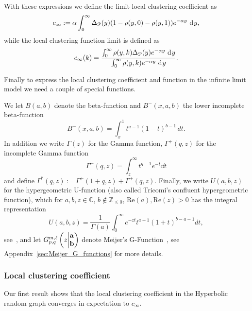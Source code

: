 With these expressions we define the limit local clustering coefficient as
\begin{equation}\label{eq:def_average_clustering_infinite_model}
	c_\infty := \alpha \int_0^\infty \Delta_{\Pcal}(y) (1 - \rho(y,0) - \rho(y,1)) e^{-\alpha y} \dd y,
\end{equation}
while the local clustering function limit is defined as
\begin{equation}\label{eq:def_c_infty_k}
	c_\infty(k) = \frac{\int_0^\infty \rho(y,k) \Delta_\Pcal(y) e^{-\alpha y} \dd y}{\int_0^\infty \rho(y,k) e^{-\alpha y} \dd y}.
\end{equation}

Finally to express the local clustering coefficient and function in the infinite limit model we need a couple of special functions. 

We let $B(a,b)$ denote the beta-function 
and $B^-(x,a,b)$ the lower incomplete beta-function
\[
	B^-(x,a,b) = \int_x^1 t^{a-1}(1-t)^{b-1} \, dt.
\]
In addition we write $\Gamma(z)$ for the Gamma function, $\Gamma^+(q,z)$ for the incomplete Gamma function
\[
	\Gamma^+(q,z) = \int_z^\infty t^{q - 1} e^{-t} \dd t
\]
and define $\Gamma^\ast(q,z) := \Gamma^+(1 + q, z) + \Gamma^+(q, z)$. Finally, we write $U(a,b,z)$ for the hypergeometric U-function (also called Tricomi's confluent hypergeometric function), which for $a,b,z\in \mathbb{C}$, $b \not \in \mathbb{Z}_{\leq 0}$, $\mathrm{Re}(a), \mathrm{Re}(z) >0$ has the integral representation 
\[
	U(a,b,z) = \frac{1}{\Gamma(a)} \int_0^\infty e^{-zt} t^{a-1} (1+t)^{b-a-1} dt,
\] 
see~\cite[p.255 Equation (2)]{erdelyi1953higher}, and let $\MeijerGnew{m}{\ell}{p}{q}{{\bf a}}{{\bf b}}{z}$ denote Meijer's G-Function~\cite{meijer1946g}, see Appendix~\ref{sec:Meijer_G_functions} for more details.

\subsubsection{Local clustering coefficient}


Our first result shows that the local clustering coefficient in the Hyperbolic random graph converges in expectation to $c_\infty$.


